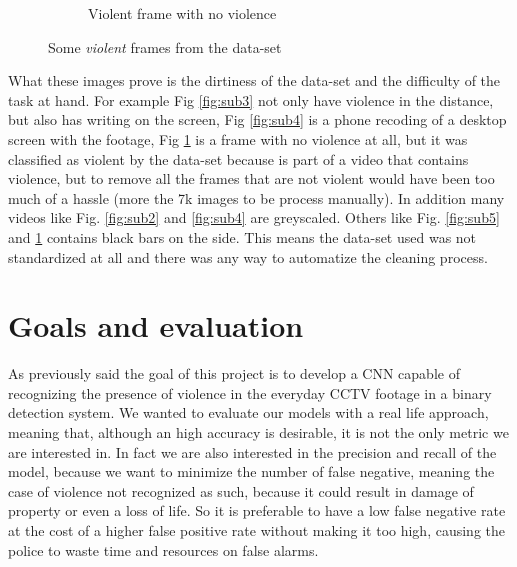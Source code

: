 \begin{figure}[]
\begin{subfigure}{.5\textwidth}
        \caption{Violent frame with no violence}
        \label{fig:sub6}
    \end{subfigure}
    \caption{Some \textit{violent} frames from the data-set}
    \label{fig:overall}
\end{figure}

What these images prove is the dirtiness of the data-set and the difficulty of the task at hand. For example Fig \ref{fig:sub3} not only have violence in the distance, but also has writing on the screen, Fig \ref{fig:sub4} is a phone recoding of a desktop screen with the footage, Fig \ref{fig:sub6} is a frame with no violence at all, but it was classified as violent by the data-set because is part of a video that contains violence, but to remove all the frames that are not violent would have been too much of a hassle (more the 7k images to be process manually). In addition many videos like Fig. \ref{fig:sub2} and \ref{fig:sub4} are greyscaled. Others like Fig. \ref{fig:sub5} and \ref{fig:sub6} contains black bars on the side. This means the data-set used was not standardized at all and there was any way to automatize the cleaning process.

\section{Goals and evaluation}
As previously said the goal of this project is to develop a CNN capable of recognizing the presence of violence in the everyday CCTV footage in a binary detection system. We wanted to evaluate our models with a real life approach, meaning that, although an high accuracy is desirable, it is not the only metric we are interested in. In fact we are also interested in the precision and recall of the model, because we want to minimize the number of false negative, meaning the case of violence not recognized as such, because it could result in damage of property or even a loss of life. So it is preferable to have a low false negative rate at the cost of a higher false positive rate without making it too high, causing the police to waste time and resources on false alarms. 